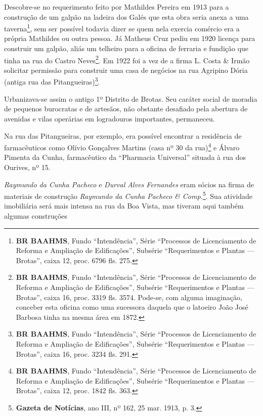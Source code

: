 Descobre-se no requerimento feito por Mathildes Pereira em 1913 para a construção de um galpão na ladeira dos Galés que esta obra seria anexa a uma taverna\footnote{\textbf{BR BAAHMS}, Fundo ``Intendência'', Série ``Processos de Licenciamento de Reforma e Ampliação de Edificações'', Subsérie ``Requerimentos e Plantas --- Brotas'', caixa 12, proc. 6796 fls. 275.}, sem ser possível todavia dizer se quem nela exercia comércio era a própria Mathildes ou outra pessoa. Já Matheus Cruz pediu em 1920 licença para construir um galpão, aliás um telheiro para a oficina de ferraria e fundição que tinha na rua do Castro Neves\footnote{\textbf{BR BAAHMS}, Fundo ``Intendência'', Série ``Processos de Licenciamento de Reforma e Ampliação de Edificações'', Subsérie ``Requerimentos e Plantas --- Brotas'', caixa 16, proc. 3319 fls. 3574. Pode-se, com alguma imaginação, conceber esta oficina como uma sucessora daquela que o latoeiro João José Barbosa tinha na mesma área em 1872.}. Em 1922 foi a vez de a firma L. Costa \& Irmão solicitar permissão para construir uma casa de negócios na rua Agripino Dória (antiga rua das Pitangueiras)\footnote{\textbf{BR BAAHMS}, Fundo ``Intendência'', Série ``Processos de Licenciamento de Reforma e Ampliação de Edificações'', Subsérie ``Requerimentos e Plantas --- Brotas'', caixa 16, proc. 3234 fls. 291.}.


Urbanizava-se assim o antigo 1º Distrito de Brotas. Seu caráter social de moradia de pequenos burocratas e de artesãos, não obstante desafiado pela abertura de avenidas e vilas operárias em logradouros importantes, permaneceu.

Na rua das Pitangueiras, por exemplo, era possível encontrar a residência de farmacêuticos como Olívio Gonçalves Martins (casa nº 30 da rua)\footnote{\textbf{BR BAAHMS}, Fundo ``Intendência'', Série ``Processos de Licenciamento de Reforma e Ampliação de Edificações'', Subsérie ``Requerimentos e Plantas --- Brotas'', caixa 12, proc. 1842 fls. 363.} e Álvaro Pimenta da Cunha, farmacêutico da ``Pharmacia Universal'' situada à rua dos Ourives, nº 15\cite[p.~510]{reis_almanak_1903}.

\textit{Raymundo da Cunha Pacheco} e \textit{Durval Alves Fernandes} eram sócios na firma de materiais de construção \textit{Raymundo da Cunha Pacheco \& Comp.}\footnote{\textbf{Gazeta de Notícias}, ano III, nº 162, 25 mar. 1913, p. 3.}. Sua atividade imobiliária será mais intensa na rua da Boa Vista, mas tiveram aqui também algumas construções

